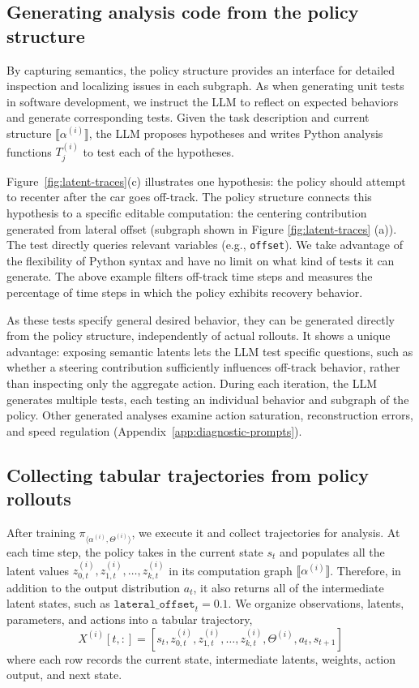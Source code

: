 \subsection{Generating analysis code from the policy structure}
\label{sec:diagnostics}

By capturing semantics, the policy structure provides an interface for detailed inspection and localizing issues in each subgraph.
As when generating unit tests in software development, we instruct the LLM to reflect on expected behaviors and generate corresponding tests.
Given the task description and current structure $\llbracket \alpha^{(i)} \rrbracket$, the LLM proposes hypotheses and writes Python analysis functions $T^{(i)}_j$ to test each of the hypotheses.

Figure~\ref{fig:latent-traces}(c) illustrates one hypothesis: the policy should attempt to recenter after the car goes off-track.
The policy structure connects this hypothesis to a specific editable computation: the centering contribution generated from lateral offset (subgraph shown in Figure \ref{fig:latent-traces} (a)).
The test directly queries relevant variables (e.g., \texttt{offset}). We take advantage of the flexibility of Python syntax and have no limit on what kind of tests it can generate.
The above example filters off-track time steps and measures the percentage of time steps in which the policy exhibits recovery behavior.

As these tests specify general desired behavior, they can be generated directly from the policy structure, independently of actual rollouts.
It shows a unique advantage: exposing semantic latents lets the LLM test specific questions, such as whether a steering contribution sufficiently influences off-track behavior, rather than inspecting only the aggregate action.
During each iteration, the LLM generates multiple tests, each testing an individual behavior and subgraph of the policy.
Other generated analyses examine action saturation, reconstruction errors, and speed regulation (Appendix~\ref{app:diagnostic-prompts}).

\subsection{Collecting tabular trajectories from policy rollouts}
\label{sec:traces}

After training $\pi_{\langle \alpha^{(i)}, \Theta^{(i)} \rangle}$, we execute it and collect trajectories for analysis.
At each time step, the policy takes in the current state $s_t$ and populates all the latent values $z^{(i)}_{0,t}, z^{(i)}_{1,t}, \dots, z^{(i)}_{k,t}$ in its computation graph $\llbracket \alpha^{(i)} \rrbracket$.
Therefore, in addition to the output distribution $a_t$, it also returns all of the intermediate latent states, such as $\texttt{lateral\_offset}_t = 0.1$.
We organize observations, latents, parameters, and actions into a tabular trajectory,
\begin{equation}
    X^{(i)}[t,:]=[s_t,z^{(i)}_{0,t}, z^{(i)}_{1,t}, \dots, z^{(i)}_{k,t},\Theta^{(i)},a_t,s_{t+1}]
    \label{eq:trace}
\end{equation}
where each row records the current state, intermediate latents, weights, action output, and next state.

